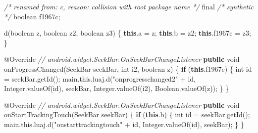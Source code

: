 \documentclass[
]{article}
\newenvironment{Shaded}{}{}
\newcommand{\AttributeTok}[1]{\textcolor[rgb]{0.49,0.56,0.16}{#1}}
\newcommand{\BuiltInTok}[1]{\textcolor[rgb]{0.00,0.50,0.00}{#1}}
\newcommand{\CommentTok}[1]{\textcolor[rgb]{0.38,0.63,0.69}{\textit{#1}}}
\newcommand{\ControlFlowTok}[1]{\textcolor[rgb]{0.00,0.44,0.13}{\textbf{#1}}}
\newcommand{\DataTypeTok}[1]{\textcolor[rgb]{0.56,0.13,0.00}{#1}}
\newcommand{\FunctionTok}[1]{\textcolor[rgb]{0.02,0.16,0.49}{#1}}
\newcommand{\KeywordTok}[1]{\textcolor[rgb]{0.00,0.44,0.13}{\textbf{#1}}}
\newcommand{\NormalTok}[1]{#1}
\newcommand{\OperatorTok}[1]{\textcolor[rgb]{0.40,0.40,0.40}{#1}}
\newcommand{\StringTok}[1]{\textcolor[rgb]{0.25,0.44,0.63}{#1}}
\begin{document}
\begin{Shaded}
\begin{Highlighting}[]
        \CommentTok{/* renamed from: c, reason: collision with root package name */}
        \DataTypeTok{final} \CommentTok{/* synthetic */} \DataTypeTok{boolean}\NormalTok{ f1967c}\OperatorTok{;}

        \FunctionTok{d}\OperatorTok{(}\DataTypeTok{boolean}\NormalTok{ z}\OperatorTok{,} \DataTypeTok{boolean}\NormalTok{ z2}\OperatorTok{,} \DataTypeTok{boolean}\NormalTok{ z3}\OperatorTok{)} \OperatorTok{\{}
            \KeywordTok{this}\OperatorTok{.}\FunctionTok{a} \OperatorTok{=}\NormalTok{ z}\OperatorTok{;}
            \KeywordTok{this}\OperatorTok{.}\FunctionTok{b} \OperatorTok{=}\NormalTok{ z2}\OperatorTok{;}
            \KeywordTok{this}\OperatorTok{.}\FunctionTok{f1967c} \OperatorTok{=}\NormalTok{ z3}\OperatorTok{;}
        \OperatorTok{\}}

        \AttributeTok{@Override} \CommentTok{// android.widget.SeekBar.OnSeekBarChangeListener}
        \KeywordTok{public} \DataTypeTok{void} \FunctionTok{onProgressChanged}\OperatorTok{(}\NormalTok{SeekBar seekBar}\OperatorTok{,} \DataTypeTok{int}\NormalTok{ i2}\OperatorTok{,} \DataTypeTok{boolean}\NormalTok{ z}\OperatorTok{)} \OperatorTok{\{}
            \ControlFlowTok{if} \OperatorTok{(}\KeywordTok{this}\OperatorTok{.}\FunctionTok{f1967c}\OperatorTok{)} \OperatorTok{\{}
                \DataTypeTok{int}\NormalTok{ id }\OperatorTok{=}\NormalTok{ seekBar}\OperatorTok{.}\FunctionTok{getId}\OperatorTok{();}
\NormalTok{                main}\OperatorTok{.}\FunctionTok{this}\OperatorTok{.}\FunctionTok{luaj}\OperatorTok{.}\FunctionTok{d}\OperatorTok{(}\StringTok{"onprogresschanged2"} \OperatorTok{+}\NormalTok{ id}\OperatorTok{,} \BuiltInTok{Integer}\OperatorTok{.}\FunctionTok{valueOf}\OperatorTok{(}\NormalTok{id}\OperatorTok{),}\NormalTok{ seekBar}\OperatorTok{,} \BuiltInTok{Integer}\OperatorTok{.}\FunctionTok{valueOf}\OperatorTok{(}\NormalTok{i2}\OperatorTok{),} \BuiltInTok{Boolean}\OperatorTok{.}\FunctionTok{valueOf}\OperatorTok{(}\NormalTok{z}\OperatorTok{));}
            \OperatorTok{\}}
        \OperatorTok{\}}

        \AttributeTok{@Override} \CommentTok{// android.widget.SeekBar.OnSeekBarChangeListener}
        \KeywordTok{public} \DataTypeTok{void} \FunctionTok{onStartTrackingTouch}\OperatorTok{(}\NormalTok{SeekBar seekBar}\OperatorTok{)} \OperatorTok{\{}
            \ControlFlowTok{if} \OperatorTok{(}\KeywordTok{this}\OperatorTok{.}\FunctionTok{b}\OperatorTok{)} \OperatorTok{\{}
                \DataTypeTok{int}\NormalTok{ id }\OperatorTok{=}\NormalTok{ seekBar}\OperatorTok{.}\FunctionTok{getId}\OperatorTok{();}
\NormalTok{                main}\OperatorTok{.}\FunctionTok{this}\OperatorTok{.}\FunctionTok{luaj}\OperatorTok{.}\FunctionTok{d}\OperatorTok{(}\StringTok{"onstarttrackingtouch"} \OperatorTok{+}\NormalTok{ id}\OperatorTok{,} \BuiltInTok{Integer}\OperatorTok{.}\FunctionTok{valueOf}\OperatorTok{(}\NormalTok{id}\OperatorTok{),}\NormalTok{ seekBar}\OperatorTok{);}
            \OperatorTok{\}}
        \OperatorTok{\}}


\end{Highlighting}
\end{Shaded}
\end{document}
